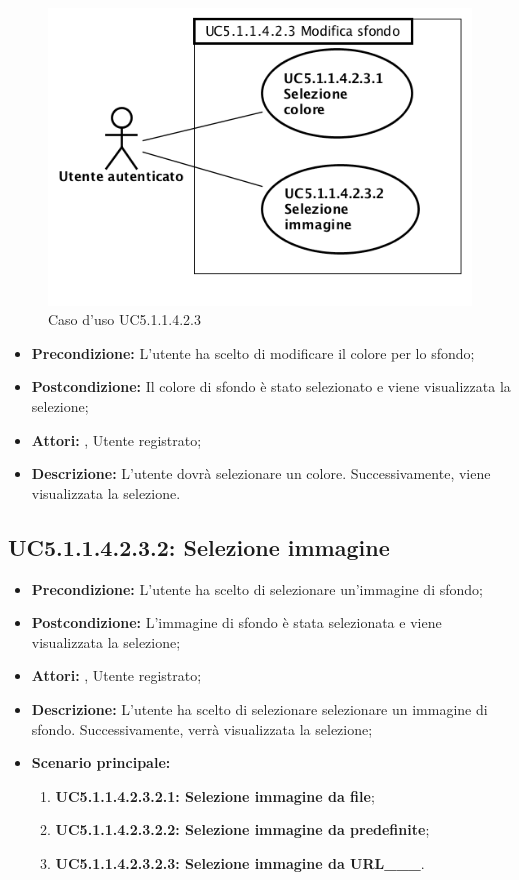 \begin{figure}[h]
	\begin{center}
	\includegraphics[scale=0.4]{diagram/UC5-1-1-4-2-3.png}
	\caption{Caso d'uso UC5.1.1.4.2.3}
	\end{center}
\end{figure}
\begin{itemize}
	\item \textbf{Precondizione:} L'utente ha scelto di modificare il colore per lo sfondo;
	\item \textbf{Postcondizione:} Il colore di sfondo è stato selezionato e viene visualizzata la selezione;
	\item \textbf{Attori:} , Utente registrato;
	\item \textbf{Descrizione:} L'utente dovrà selezionare un colore.  Successivamente, viene visualizzata la selezione.
\end{itemize}
\subsection{ UC5.1.1.4.2.3.2: Selezione immagine}

\begin{itemize}
	\item \textbf{Precondizione:} L'utente ha scelto di selezionare un'immagine di sfondo;
	\item \textbf{Postcondizione:} L'immagine di sfondo è stata selezionata e viene visualizzata la selezione;
	\item \textbf{Attori:} , Utente registrato;
	\item \textbf{Descrizione:} L'utente ha scelto di selezionare selezionare un immagine di sfondo. Successivamente, verrà visualizzata la selezione;
	\item \textbf{Scenario principale:}
	\begin{enumerate}
		\item \textbf{ UC5.1.1.4.2.3.2.1: Selezione immagine da file};
		\item \textbf{ UC5.1.1.4.2.3.2.2: Selezione immagine da predefinite};
		\item \textbf{ UC5.1.1.4.2.3.2.3: Selezione immagine da URL___}.
	\end{enumerate}
\end{itemize}
